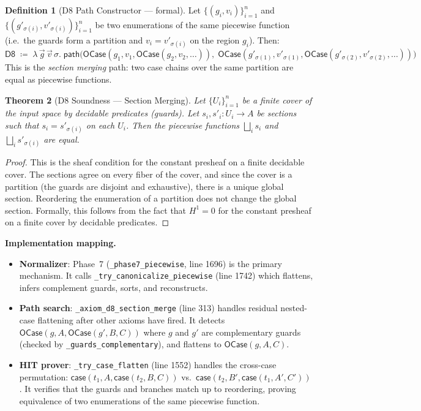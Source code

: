 \documentclass[11pt,a4paper]{report}
\theoremstyle{definition}
\newtheorem{definition}{Definition}[chapter]
\theoremstyle{plain}
\newtheorem{theorem}[definition]{Theorem}
\newcommand{\Hone}{H^1}
\begin{document}
\begin{definition}[D8 Path Constructor --- formal]
\label{def:d8-path}
Let $\{(g_i, v_i)\}_{i=1}^{n}$ and $\{(g'_{\sigma(i)},
v'_{\sigma(i)})\}_{i=1}^{n}$ be two enumerations of the same
piecewise function (i.e.\ the guards form a partition and
$v_i = v'_{\sigma(i)}$ on the region $g_i$).  Then:
\[
  \mathsf{D8} \;\coloneqq\; \lambda\, \vec{g}\, \vec{v}\, \sigma.\;
  \mathsf{path}\!\big(
    \mathsf{OCase}(g_1, v_1, \mathsf{OCase}(g_2, v_2, \ldots)),\;
    \mathsf{OCase}(g'_{\sigma(1)}, v'_{\sigma(1)},
      \mathsf{OCase}(g'_{\sigma(2)}, v'_{\sigma(2)}, \ldots))
  \big)
\]
This is the \emph{section merging} path: two case chains over the
same partition are equal as piecewise functions.
\end{definition}

\begin{theorem}[D8 Soundness --- Section Merging]
\label{thm:d8-sound}
Let $\{U_i\}_{i=1}^{n}$ be a finite cover of the input space by
decidable predicates (guards).  Let $s_i, s'_i : U_i \to A$ be
sections such that $s_i = s'_{\sigma(i)}$ on each $U_i$.  Then
the piecewise functions $\bigsqcup_i s_i$ and
$\bigsqcup_i s'_{\sigma(i)}$ are equal.
\end{theorem}

\begin{proof}
This is the sheaf condition for the constant presheaf on a finite
decidable cover.  The sections agree on every fiber of the cover, and
since the cover is a partition (the guards are disjoint and
exhaustive), there is a unique global section.  Reordering the
enumeration of a partition does not change the global section.
Formally, this follows from the fact that $\Hone = 0$ for the
constant presheaf on a finite cover by decidable predicates.
\end{proof}

\textbf{Implementation mapping.}
\begin{itemize}
  \item \textbf{Normalizer}: Phase~7 (\texttt{\_phase7\_piecewise},
    line 1696) is the primary mechanism.  It calls
    \texttt{\_try\_canonicalize\_piecewise} (line 1742) which
    flattens, infers complement guards, sorts, and reconstructs.
  \item \textbf{Path search}: \texttt{\_axiom\_d8\_section\_merge}
    (line 313) handles residual nested-case flattening after other
    axioms have fired.  It detects
    $\mathsf{OCase}(g, A, \mathsf{OCase}(g', B, C))$ where $g$
    and $g'$ are complementary guards (checked by
    \texttt{\_guards\_complementary}), and flattens to
    $\mathsf{OCase}(g, A, C)$.
  \item \textbf{HIT prover}: \texttt{\_try\_case\_flatten}
    (line 1552) handles the cross-case permutation:
    $\mathsf{case}(t_1, A, \mathsf{case}(t_2, B, C))$ vs.\
    $\mathsf{case}(t_2, B', \mathsf{case}(t_1, A', C'))$.
    It verifies that the guards and branches match up to
    reordering, proving equivalence of two enumerations of the
    same piecewise function.
\end{itemize}
\end{document}
